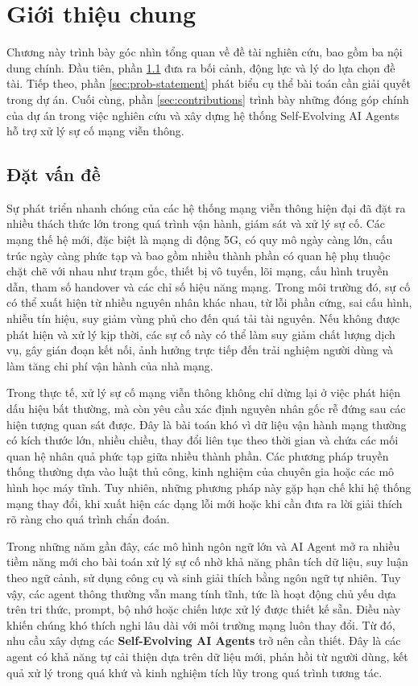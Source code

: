 \chapter{Giới thiệu chung}
\label{chap:introduction}

Chương này trình bày góc nhìn tổng quan về đề tài nghiên cứu, bao gồm ba nội dung chính. Đầu tiên, phần \ref{sec:motivation} đưa ra bối cảnh, động lực và lý do lựa chọn đề tài. Tiếp theo, phần \ref{sec:prob-statement} phát biểu cụ thể bài toán cần giải quyết trong dự án. Cuối cùng, phần \ref{sec:contributions} trình bày những đóng góp chính của dự án trong việc nghiên cứu và xây dựng hệ thống Self-Evolving AI Agents hỗ trợ xử lý sự cố mạng viễn thông.

\section{Đặt vấn đề}
\label{sec:motivation}

Sự phát triển nhanh chóng của các hệ thống mạng viễn thông hiện đại đã đặt ra nhiều thách thức lớn trong quá trình vận hành, giám sát và xử lý sự cố. Các mạng thế hệ mới, đặc biệt là mạng di động 5G, có quy mô ngày càng lớn, cấu trúc ngày càng phức tạp và bao gồm nhiều thành phần có quan hệ phụ thuộc chặt chẽ với nhau như trạm gốc, thiết bị vô tuyến, lõi mạng, cấu hình truyền dẫn, tham số handover và các chỉ số hiệu năng mạng. Trong môi trường đó, sự cố có thể xuất hiện từ nhiều nguyên nhân khác nhau, từ lỗi phần cứng, sai cấu hình, nhiễu tín hiệu, suy giảm vùng phủ cho đến quá tải tài nguyên. Nếu không được phát hiện và xử lý kịp thời, các sự cố này có thể làm suy giảm chất lượng dịch vụ, gây gián đoạn kết nối, ảnh hưởng trực tiếp đến trải nghiệm người dùng và làm tăng chi phí vận hành của nhà mạng.

Trong thực tế, xử lý sự cố mạng viễn thông không chỉ dừng lại ở việc phát hiện dấu hiệu bất thường, mà còn yêu cầu xác định nguyên nhân gốc rễ đứng sau các hiện tượng quan sát được. Đây là bài toán khó vì dữ liệu vận hành mạng thường có kích thước lớn, nhiều chiều, thay đổi liên tục theo thời gian và chứa các mối quan hệ nhân quả phức tạp giữa nhiều thành phần. Các phương pháp truyền thống thường dựa vào luật thủ công, kinh nghiệm của chuyên gia hoặc các mô hình học máy tĩnh. Tuy nhiên, những phương pháp này gặp hạn chế khi hệ thống mạng thay đổi, khi xuất hiện các dạng lỗi mới hoặc khi cần đưa ra lời giải thích rõ ràng cho quá trình chẩn đoán.

Trong những năm gần đây, các mô hình ngôn ngữ lớn và AI Agent mở ra nhiều tiềm năng mới cho bài toán xử lý sự cố nhờ khả năng phân tích dữ liệu, suy luận theo ngữ cảnh, sử dụng công cụ và sinh giải thích bằng ngôn ngữ tự nhiên. Tuy vậy, các agent thông thường vẫn mang tính tĩnh, tức là hoạt động chủ yếu dựa trên tri thức, prompt, bộ nhớ hoặc chiến lược xử lý được thiết kế sẵn. Điều này khiến chúng khó thích nghi lâu dài với môi trường mạng luôn thay đổi. Từ đó, nhu cầu xây dựng các \textbf{Self-Evolving AI Agents} trở nên cần thiết. Đây là các agent có khả năng tự cải thiện dựa trên dữ liệu mới, phản hồi từ người dùng, kết quả xử lý trong quá khứ và kinh nghiệm tích lũy trong quá trình tương tác.

